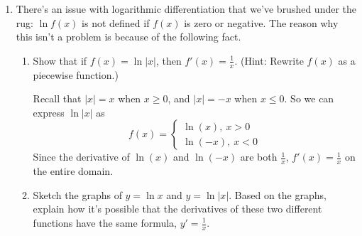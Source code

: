 \documentclass[main]{subfiles}
\begin{document}
\begin{enumerate}[resume]
\item
    There's an issue with logarithmic differentiation that we've brushed under the rug: $\ln f(x)$ is not defined if $f(x)$ is zero or negative. The reason why this isn't a problem is because of the following fact.

\begin{enumerate}

\item 
\begin{problem}
    Show that if $f(x)=\ln|x|$, then $f'(x)=\frac{1}{x}$. (Hint: Rewrite $f(x)$ as a piecewise function.) 
\end{problem}

\begin{solution}
    Recall that $|x|= x$ when $x\geq0$, and $|x|=-x$ when $x\leq0$. So we can express
    $\ln|x|$ as
    \[f(x)=
    \begin{cases}
        \ln(x),\ x>0 \\
        \ln(-x),\ x<0
    \end{cases}\]
    Since the derivative of $\ln(x)$ and $\ln(-x)$ are both $\frac{1}{x}$, $f'(x)=\frac{1}{x}$ on the entire domain.
\end{solution}

\item 
\begin{problem}
Sketch the graphs of $y=\ln x$ and $y=\ln|x|$. Based on the graphs, explain how it's possible that the derivatives of these two different functions have the same formula, $y'=\frac{1}{x}$.
\end{problem}


\end{enumerate}
\end{enumerate}
\end{document}
